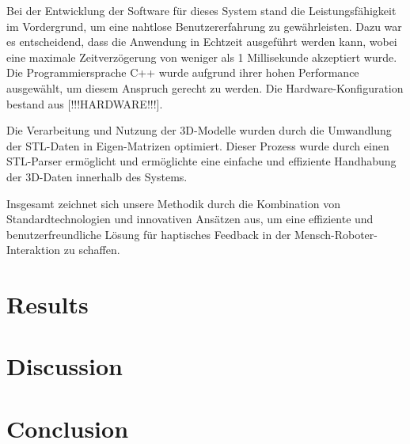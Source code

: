 \documentclass[conference]{IEEEtran}
\begin{document}
Bei der Entwicklung der Software für dieses System stand die Leistungsfähigkeit im Vordergrund, um eine nahtlose Benutzererfahrung zu gewährleisten. Dazu war es entscheidend, dass die Anwendung in Echtzeit ausgeführt werden kann, wobei eine maximale Zeitverzögerung von weniger als 1 Millisekunde akzeptiert wurde. Die Programmiersprache C++ wurde aufgrund ihrer hohen Performance ausgewählt, um diesem Anspruch gerecht zu werden. Die Hardware-Konfiguration bestand aus [!!!HARDWARE!!!].

Die Verarbeitung und Nutzung der 3D-Modelle wurden durch die Umwandlung der STL-Daten in Eigen-Matrizen optimiert. Dieser Prozess wurde durch einen STL-Parser ermöglicht und ermöglichte eine einfache und effiziente Handhabung der 3D-Daten innerhalb des Systems.

Insgesamt zeichnet sich unsere Methodik durch die Kombination von Standardtechnologien und innovativen Ansätzen aus, um eine effiziente und benutzerfreundliche Lösung für haptisches Feedback in der Mensch-Roboter-Interaktion zu schaffen.

\section{Results}

\section{Discussion}

\section{Conclusion}

\printbibliography
\end{document}
